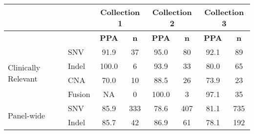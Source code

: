 \begin{tabular}{|l|l|c|c|c|c|c|c|}
\hline
\rowcolor[gray]{.85}            &         &  \multicolumn{2}{c|}{\textbf{Collection 1}}  &  \multicolumn{2}{c|}{\textbf{Collection 2}}  &  \multicolumn{2}{c|}{\textbf{Collection 3}} \\ \hline
\rowcolor[gray]{.85}            &         & \textbf{PPA} & \textbf{n} & \textbf{PPA} & \textbf{n} & \textbf{PPA} & \textbf{    n }\\ \hline
\multirow{4}{*}{Clinically Relevant} & SNV &         91.9 &   37 &         95.0 &   80 &         92.1 &   89 \\ \cline{2-8}
           & Indel &        100.0 &    6 &         93.9 &   33 &         80.0 &   65 \\ \cline{2-8}
           & CNA &         70.0 &   10 &         88.5 &   26 &         73.9 &   23 \\ \cline{2-8}
           & Fusion &           NA &    0 &        100.0 &    3 &         97.1 &   35 \\ \hline
\multirow{2}{*}{Panel-wide} & SNV &         85.9 &  333 &         78.6 &  407 &         81.1 &  735 \\ \cline{2-8}
           & Indel &         85.7 &   42 &         86.9 &   61 &         78.1 &  192 \\ \hline
\end{tabular}